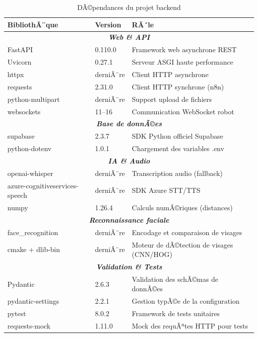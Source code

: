 \begin{table}[H]
\centering
\caption{DÃ©pendances du projet backend}
\label{tab:dependencies}
\renewcommand{\arraystretch}{1.3}
\begin{tabular}{|l|l|p{6cm}|}
\hline
\textbf{BibliothÃ¨que} & \textbf{Version} & \textbf{RÃ´le} \\
\hline
\multicolumn{3}{|c|}{\textit{\textbf{Web \& API}}} \\
\hline
FastAPI & 0.110.0 & Framework web asynchrone REST \\
Uvicorn & 0.27.1 & Serveur ASGI haute performance \\
httpx & derniÃ¨re & Client HTTP asynchrone \\
requests & 2.31.0 & Client HTTP synchrone (n8n) \\
python-multipart & derniÃ¨re & Support upload de fichiers \\
websockets & 11--16 & Communication WebSocket robot \\
\hline
\multicolumn{3}{|c|}{\textit{\textbf{Base de donnÃ©es}}} \\
\hline
supabase & 2.3.7 & SDK Python officiel Supabase \\
python-dotenv & 1.0.1 & Chargement des variables .env \\
\hline
\multicolumn{3}{|c|}{\textit{\textbf{IA \& Audio}}} \\
\hline
openai-whisper & derniÃ¨re & Transcription audio (fallback) \\
azure-cognitiveservices-speech & derniÃ¨re & SDK Azure STT/TTS \\
numpy & 1.26.4 & Calculs numÃ©riques (distances) \\
\hline
\multicolumn{3}{|c|}{\textit{\textbf{Reconnaissance faciale}}} \\
\hline
face\_recognition & derniÃ¨re & Encodage et comparaison de visages \\
cmake + dlib-bin & derniÃ¨re & Moteur de dÃ©tection de visages (CNN/HOG) \\
\hline
\multicolumn{3}{|c|}{\textit{\textbf{Validation \& Tests}}} \\
\hline
Pydantic & 2.6.3 & Validation des schÃ©mas de donnÃ©es \\
pydantic-settings & 2.2.1 & Gestion typÃ©e de la configuration \\
pytest & 8.0.2 & Framework de tests unitaires \\
requests-mock & 1.11.0 & Mock des requÃªtes HTTP pour tests \\
\hline
\end{tabular}
\end{table}

